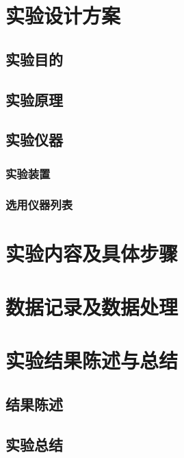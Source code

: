 \documentclass[a4paper,zihao=5,UTF8,fontset=fandol]{phyreport}
\begin{document}
\phyExpCover


\fancypage{\fbox}{} %

\section{实验设计方案}

\subsection{实验目的}

\subsection{实验原理}

\subsection{实验仪器}

\subsubsection{实验装置}

\subsubsection{选用仪器列表}

\smartLongLine
\section{实验内容及具体步骤}

\smartLongLine
\section{数据记录及数据处理}

\smartLongLine
\section{实验结果陈述与总结}

\subsection{结果陈述}

\subsection{实验总结}

\endBox




\end{document}
